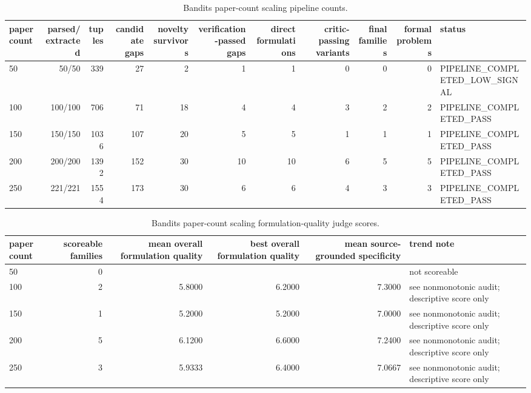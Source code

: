 \begin{table}[htbp]
\centering
\caption{Bandits paper-count scaling pipeline counts.}
\label{tab:paper\_scaling\_counts}
\begin{tabular}{lrrrrrrrrrl}
\toprule
paper count & parsed/extracted & tuples & candidate gaps & novelty survivors & verification-passed gaps & direct formulations & critic-passing variants & final families & formal problems & status \\
\midrule
50 & 50/50 & 339 & 27 & 2 & 1 & 1 & 0 & 0 & 0 & PIPELINE\_COMPLETED\_LOW\_SIGNAL \\
100 & 100/100 & 706 & 71 & 18 & 4 & 4 & 3 & 2 & 2 & PIPELINE\_COMPLETED\_PASS \\
150 & 150/150 & 1036 & 107 & 20 & 5 & 5 & 1 & 1 & 1 & PIPELINE\_COMPLETED\_PASS \\
200 & 200/200 & 1392 & 152 & 30 & 10 & 10 & 6 & 5 & 5 & PIPELINE\_COMPLETED\_PASS \\
250 & 221/221 & 1554 & 173 & 30 & 6 & 6 & 4 & 3 & 3 & PIPELINE\_COMPLETED\_PASS \\
\bottomrule
\end{tabular}
\end{table}

\begin{table}[htbp]
\centering
\caption{Bandits paper-count scaling formulation-quality judge scores.}
\label{tab:paper\_scaling\_judge}
\begin{tabular}{lrrrrl}
\toprule
paper count & scoreable families & mean overall formulation quality & best overall formulation quality & mean source-grounded specificity & trend note \\
\midrule
50 & 0 &  &  &  & not scoreable \\
100 & 2 & 5.8000 & 6.2000 & 7.3000 & see nonmonotonic audit; descriptive score only \\
150 & 1 & 5.2000 & 5.2000 & 7.0000 & see nonmonotonic audit; descriptive score only \\
200 & 5 & 6.1200 & 6.6000 & 7.2400 & see nonmonotonic audit; descriptive score only \\
250 & 3 & 5.9333 & 6.4000 & 7.0667 & see nonmonotonic audit; descriptive score only \\
\bottomrule
\end{tabular}
\end{table}

